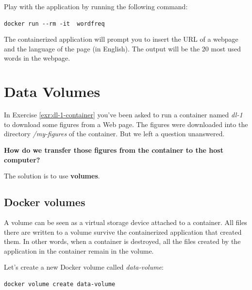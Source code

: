 \documentclass[
]{article}
\theoremstyle{definition}
\theoremstyle{definition}
\theoremstyle{definition}
\theoremstyle{remark}
\begin{document}
Play with the application by running the following command:

\texttt{docker\ run\ -\/-rm\ -it\ \ wordfreq}

The containerized application will prompt you to insert the URL of a webpage and
the language of the page (in English).
The output will be the 20 most used words in the webpage.

\section{Data Volumes}\label{data-volumes}

In Exercise \ref{exr:dl-1-container} you've been asked to run a container named
\emph{dl-1} to download some figures from a Web page.
The figures were downloaded into the
directory \emph{/my-figures} of the container.
But we left a question unanswered.

\textbf{How do we transfer those figures from the container to the host computer?}

The solution is to use \textbf{volumes}.

\subsection{Docker volumes}\label{docker-volumes}

A volume can be seen as a virtual storage device attached to a container.
All files there are written to a volume survive the containerized application that
created them. In other words, when a container is destroyed,
all the files created by the application in the container remain in the volume.

Let's create a new Docker volume called \emph{data-volume}:

\texttt{docker\ volume\ create\ data-volume}
\end{document}

